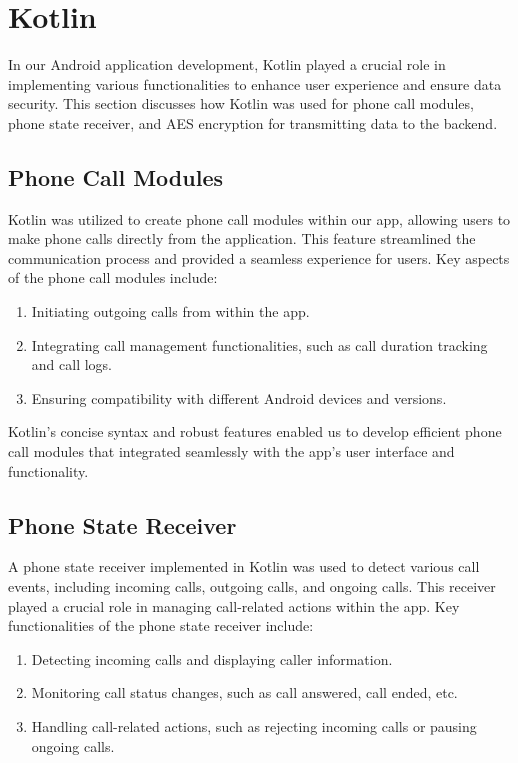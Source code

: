 \section{Kotlin}

In our Android application development, Kotlin played a crucial role in implementing various functionalities to enhance user experience and ensure data security. This section discusses how Kotlin was used for phone call modules, phone state receiver, and AES encryption for transmitting data to the backend.

\subsection{Phone Call Modules}

Kotlin was utilized to create phone call modules within our app, allowing users to make phone calls directly from the application. This feature streamlined the communication process and provided a seamless experience for users. Key aspects of the phone call modules include:

\begin{enumerate}
  \item Initiating outgoing calls from within the app.
  \item Integrating call management functionalities, such as call duration tracking and call logs.
  \item Ensuring compatibility with different Android devices and versions.
\end{enumerate}

Kotlin's concise syntax and robust features enabled us to develop efficient phone call modules that integrated seamlessly with the app's user interface and functionality.

\subsection{Phone State Receiver}

A phone state receiver implemented in Kotlin was used to detect various call events, including incoming calls, outgoing calls, and ongoing calls. This receiver played a crucial role in managing call-related actions within the app. Key functionalities of the phone state receiver include:

\begin{enumerate}
  \item Detecting incoming calls and displaying caller information.
  \item Monitoring call status changes, such as call answered, call ended, etc.
  \item Handling call-related actions, such as rejecting incoming calls or pausing ongoing calls.
\end{enumerate}

